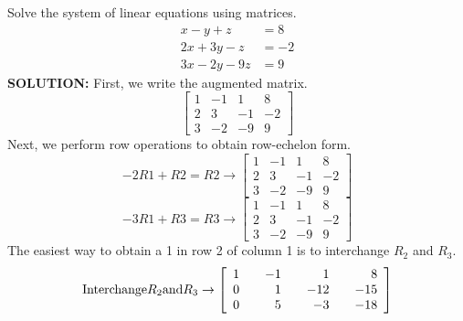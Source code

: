 \documentclass{book}
\begin{document}
Solve the system of linear equations using matrices.
\begin{align*}
  x - y + z &= 8 \\
  2x + 3y - z &= -2 \\
  3x - 2y - 9z &= 9
\end{align*}
\textbf{SOLUTION:}
First, we write the augmented matrix.
\begin{equation*}
	\begin{bmatrix}
	1 & -1 & 1 & 8\\
	2 & 3 & -1 & -2\\
	3 & -2 & -9 & 9
	\end{bmatrix}
\end{equation*}
Next, we perform row operations to obtain row-echelon form.
\begin{equation*}
	-2R1 + R2 = R2 \rightarrow
	\begin{bmatrix}
	1 & -1 & 1 & 8\\
	2 & 3 & -1 & -2\\
	3 & -2 & -9 & 9
	\end{bmatrix}
\end{equation*}
\begin{equation*}
	-3R1 + R3 = R3 \rightarrow
	\begin{bmatrix}
	1 & -1 & 1 & 8\\
	2 & 3 & -1 & -2\\
	3 & -2 & -9 & 9
	\end{bmatrix}
\end{equation*}
The easiest way to obtain a 1 in row 2 of column 1 is to interchange ${R_2}$ and ${R_3}$.
\begin{equation*}
	\text{Interchange}{R}_{2}\text{and}{R}_{3}\to \left[\begin{array}{rrrrrrr}\hfill 1& \hfill & \hfill -1& \hfill & \hfill 1& \hfill & \hfill 8\\ \hfill 0& \hfill & \hfill 1& \hfill & \hfill -12& \hfill & \hfill -15\\ \hfill 0& \hfill & \hfill 5& \hfill & \hfill -3& \hfill & \hfill -18\end{array}\right]
\end{equation*}
\end{document}
